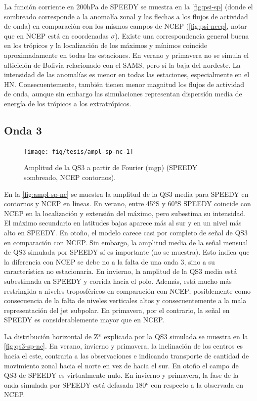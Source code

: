 \documentclass[spanish,a4paper,12pt,oneside]{book}
\begin{document}
La función corriente en 200hPa de SPEEDY se muestra en la
\autoref{fig:psi-sp} (donde el sombreado corresponde a la anomalía zonal
y las flechas a los flujos de actividad de onda) en comparación con los
mismos campos de NCEP (\autoref{fig:psi-ncep}, notar que en NCEP está en
coordenadas \(\sigma\)). Existe una correspondencia general buena en los
trópicos y la localización de los máximos y mínimos coincide
aproximadamente en todas las estaciones. En verano y primavera no se
simula el alticiclón de Bolivia relacionado con el SAMS, pero sí la baja
del nordeste. La intensidad de las anomalías es menor en todas las
estaciones, especialmente en el HN. Consecuentemente, también tienen
menor magnitud los flujos de actividad de onda, aunque sin embargo las
simulaciones representan dispersión media de energía de los trópicos a
los extratrópicos.

\subsection{Onda 3}\label{onda-3-1}

\begin{figure}
\texttt{[image: fig/tesis/ampl-sp-nc-1]} \caption{Amplitud de la QS3 a partir de Fourier (mgp) (SPEEDY sombreado, NCEP contornos).}\label{fig:ampl-sp-nc}
\end{figure}

En la \autoref{fig:ampl-sp-nc} se muestra la amplitud de la QS3 media
para SPEEDY en contornos y NCEP en líneas. En verano, entre 45°S y 60°S
SPEEDY coincide con NCEP en la localización y extensión del máximo, pero
subestima su intensidad. El máximo secundario en latitudes bajas aparece
más al sur y en un nivel más alto en SPEEDY. En otoño, el modelo carece
casi por completo de señal de QS3 en comparación con NCEP. Sin embargo,
la amplitud media de la señal mensual de QS3 simulada por SPEEDY sí es
importante (no se muestra). Esto indica que la diferencia con NCEP se
debe no a la falta de una onda 3, sino a su característica no
estacionaria. En invierno, la amplitud de la QS3 media está subestimada
en SPEEDY y corrida hacia el polo. Además, está mucho más restringida a
niveles troposféricos en comparación con NCEP; posiblemente como
consecuencia de la falta de niveles verticales altos y consecuentemente
a la mala representación del jet subpolar. En primavera, por el
contrario, la señal en SPEEDY es considerablemente mayor que en NCEP.

La distribución horizontal de Z* explicada por la QS3 simulada se
muestra en la \autoref{fig:qs3-sp-nc}. En verano, invierno y primavera,
la inclinación de los centros es hacia el este, contraria a las
observaciones e indicando transporte de cantidad de movimiento zonal
hacia el norte en vez de hacia el sur. En otoño el campo de QS3 de
SPEEDY es virtualmente nulo. En invierno y primavera, la fase de la onda
simulada por SPEEDY está defasada 180° con respecto a la observada en
NCEP.
\end{document}
